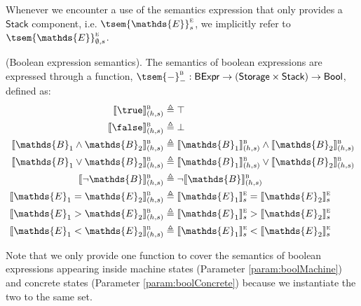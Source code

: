 Whenever we encounter a use of the semantics expression that only provides a $\mathsf{Stack}$ component, i.e. $\tsem{\mathds{E}}_s^\textsc{e}$, we implicitly refer to $\tsem{\mathds{E}}_{\emptyset, s}^\textsc{e}$.

\begin{defn}
	(Boolean expression semantics).
	The semantics of boolean expressions are expressed through a function, $\tsem{-}_-^\textsc{b} : \mathsf{BExpr} \rightarrow (\mathsf{Storage} \times \mathsf{Stack}) \rightarrow \mathsf{Bool}$, defined as:
	\begin{align*}
		\llbracket \true \rrbracket_{(h, s)}^\textsc{b} &\triangleq \top \\
		\llbracket \false \rrbracket_{(h, s)}^\textsc{b} &\triangleq \bot \\
		\llbracket \mathds{B}_1 \land \mathds{B}_2 \rrbracket_{(h, s)}^\textsc{b} &\triangleq \llbracket \mathds{B}_1 \rrbracket_{(h, s)}^\textsc{b} \land \llbracket \mathds{B}_2 \rrbracket_{(h, s)}^\textsc{b} \\
		\llbracket \mathds{B}_1 \lor \mathds{B}_2 \rrbracket_{(h, s)}^\textsc{b} &\triangleq \llbracket \mathds{B}_1 \rrbracket_{(h, s)}^\textsc{b} \lor \llbracket \mathds{B}_2 \rrbracket_{(h, s)}^\textsc{b} \\
		\llbracket \lnot \mathds{B} \rrbracket_{(h, s)}^\textsc{b} &\triangleq \lnot \llbracket \mathds{B} \rrbracket_{(h, s)}^\textsc{b} \\
		\llbracket \mathds{E}_1 = \mathds{E}_2 \rrbracket_{(h, s)}^\textsc{b} &\triangleq \llbracket \mathds{E}_1 \rrbracket_{s}^\textsc{e} = \llbracket \mathds{E}_2 \rrbracket_{s}^\textsc{e} \\
		\llbracket \mathds{E}_1 > \mathds{E}_2 \rrbracket_{(h, s)}^\textsc{b} &\triangleq \llbracket \mathds{E}_1 \rrbracket_{s}^\textsc{e} > \llbracket \mathds{E}_2 \rrbracket_{s}^\textsc{e} \\
		\llbracket \mathds{E}_1 < \mathds{E}_2 \rrbracket_{(h, s)}^\textsc{b} &\triangleq \llbracket \mathds{E}_1 \rrbracket_{s}^\textsc{e} < \llbracket \mathds{E}_2 \rrbracket_{s}^\textsc{e}
	\end{align*}
\end{defn}
Note that we only provide one function to cover the semantics of boolean expressions appearing inside machine states (Parameter \ref{param:boolMachine}) and concrete states (Parameter \ref{param:boolConcrete}) because we instantiate the two to the same set.

